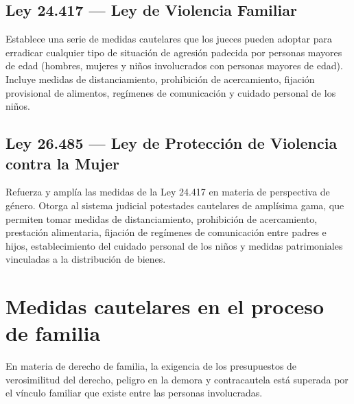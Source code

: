 \documentclass[12pt,oneside]{book}
\begin{document}
\subsection{Ley 24.417 --- Ley de Violencia Familiar}

Establece una serie de medidas cautelares que los jueces pueden adoptar para erradicar cualquier tipo de situación de agresión padecida por personas mayores de edad (hombres, mujeres y niños involucrados con personas mayores de edad). %
Incluye medidas de distanciamiento, prohibición de acercamiento, fijación provisional de alimentos, regímenes de comunicación y cuidado personal de los niños.

\subsection{Ley 26.485 --- Ley de Protección de Violencia contra la Mujer}

Refuerza y amplía las medidas de la Ley 24.417 en materia de perspectiva de género. Otorga al sistema judicial potestades cautelares de amplísima gama, que permiten tomar medidas de distanciamiento, prohibición de acercamiento, prestación alimentaria, fijación de regímenes de comunicación entre padres e hijos, establecimiento del cuidado personal de los niños y medidas patrimoniales vinculadas a la distribución de bienes.

\section{Medidas cautelares en el proceso de familia}

En materia de derecho de familia, la exigencia de los presupuestos de verosimilitud del derecho, peligro en la demora y contracautela está superada por el vínculo familiar que existe entre las personas involucradas.
\end{document}
